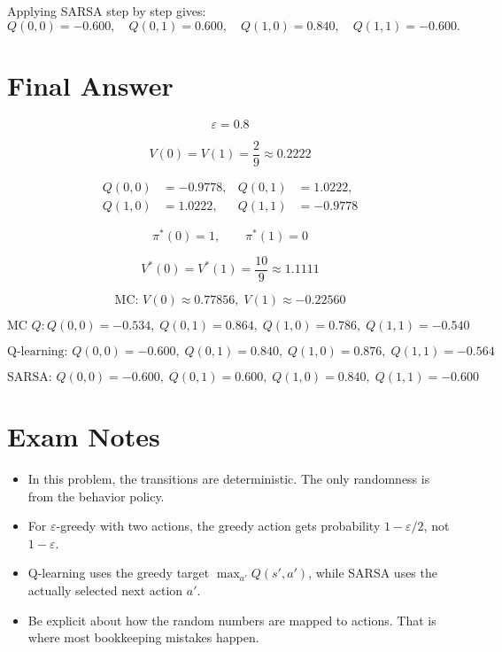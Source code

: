 \documentclass[11pt]{article}
\begin{document}
Applying SARSA step by step gives:
\[
    \boxed{
    Q(0,0)=-0.600,\quad
    Q(0,1)=0.600,\quad
    Q(1,0)=0.840,\quad
    Q(1,1)=-0.600
    }.
\]

\section*{Final Answer}

\[
    \boxed{\varepsilon=0.8}
\]

\[
    \boxed{
    V(0)=V(1)=\frac{2}{9}\approx 0.2222
    }
\]

\[
    \boxed{
    \begin{aligned}
    Q(0,0)&=-0.9778, & Q(0,1)&=1.0222,\\
    Q(1,0)&=1.0222,  & Q(1,1)&=-0.9778
    \end{aligned}}
\]

\[
    \boxed{\pi^*(0)=1,\qquad \pi^*(1)=0}
\]

\[
    \boxed{
    V^*(0)=V^*(1)=\frac{10}{9}\approx 1.1111
    }
\]

\[
    \boxed{
    \text{MC: }
    V(0)\approx 0.77856,\;
    V(1)\approx -0.22560
    }
\]

\[
    \boxed{
    \text{MC }Q:
    Q(0,0)=-0.534,\;
    Q(0,1)=0.864,\;
    Q(1,0)=0.786,\;
    Q(1,1)=-0.540
    }
\]

\[
    \boxed{
    \text{Q-learning: }
    Q(0,0)=-0.600,\;
    Q(0,1)=0.840,\;
    Q(1,0)=0.876,\;
    Q(1,1)=-0.564
    }
\]

\[
    \boxed{
    \text{SARSA: }
    Q(0,0)=-0.600,\;
    Q(0,1)=0.600,\;
    Q(1,0)=0.840,\;
    Q(1,1)=-0.600
    }
\]

\section*{Exam Notes}

\begin{itemize}
    \item In this problem, the transitions are deterministic. The only randomness
    is from the behavior policy.
    \item For \(\varepsilon\)-greedy with two actions, the greedy action gets
    probability \(1-\varepsilon/2\), not \(1-\varepsilon\).
    \item Q-learning uses the greedy target
    \(\max_{a'}Q(s',a')\), while SARSA uses the actually selected next action
    \(a'\).
    \item Be explicit about how the random numbers are mapped to actions. That is
    where most bookkeeping mistakes happen.
\end{itemize}
\end{document}
